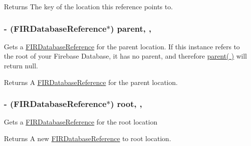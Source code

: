 \begin{DoxyReturn}{Returns}
The key of the location this reference points to. 
\end{DoxyReturn}
\hypertarget{interface_f_i_r_database_reference_ad96326c4ad0e5d3624bac296b707b957}{}
\subsubsection[{parent}]{\setlength{\rightskip}{0pt plus 5cm}-\/ ({\bf F\+I\+R\+Database\+Reference}$\ast$) parent\hspace{0.3cm}{\ttfamily [read]}, {\ttfamily [nonatomic]}, {\ttfamily [strong]}}\label{interface_f_i_r_database_reference_ad96326c4ad0e5d3624bac296b707b957}
Gets a \hyperlink{interface_f_i_r_database_reference}{F\+I\+R\+Database\+Reference} for the parent location. If this instance refers to the root of your Firebase Database, it has no parent, and therefore \hyperlink{interface_f_i_r_database_reference_ad96326c4ad0e5d3624bac296b707b957}{parent( )} will return null.

\begin{DoxyReturn}{Returns}
A \hyperlink{interface_f_i_r_database_reference}{F\+I\+R\+Database\+Reference} for the parent location. 
\end{DoxyReturn}
\hypertarget{interface_f_i_r_database_reference_a3101c5136d2a2990c5ec3e26c01948af}{}
\subsubsection[{root}]{\setlength{\rightskip}{0pt plus 5cm}-\/ ({\bf F\+I\+R\+Database\+Reference}$\ast$) root\hspace{0.3cm}{\ttfamily [read]}, {\ttfamily [nonatomic]}, {\ttfamily [strong]}}\label{interface_f_i_r_database_reference_a3101c5136d2a2990c5ec3e26c01948af}
Gets a \hyperlink{interface_f_i_r_database_reference}{F\+I\+R\+Database\+Reference} for the root location

\begin{DoxyReturn}{Returns}
A new \hyperlink{interface_f_i_r_database_reference}{F\+I\+R\+Database\+Reference} to root location. 
\end{DoxyReturn}
\hypertarget{interface_f_i_r_database_reference_a6fd5f81300be3842a8a3c856a89d000d}{}
